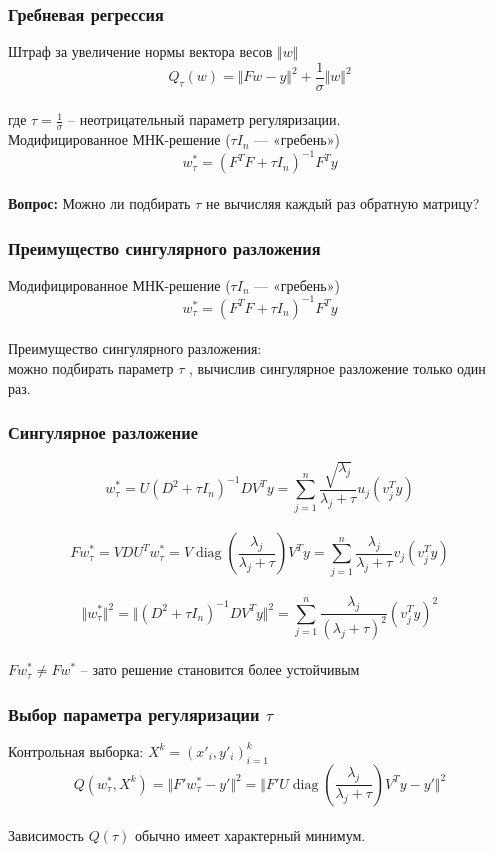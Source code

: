 \documentclass[12pt]{beamer}
\begin{document}
\begin{frame}\frametitle{Гребневая регрессия}
Штраф за увеличение нормы вектора весов $\Vert w \Vert$\\
$$Q_{\tau} (w) = \Vert F w - y \Vert^2 + \frac{1}{\sigma} \Vert w \Vert^2$$\\
где $\tau = \frac{1}{\sigma}$ -- неотрицательный параметр регуляризации.\\
\vspace{5mm}
Модифицированное МНК-решение ($\tau I_n$ — «гребень»)\\
$$w^*_{\tau} = (F^TF + \tau I_n)^{-1}F^Ty$$\\

\textbf{Вопрос:} Можно ли подбирать $\tau$ не вычисляя каждый раз обратную матрицу?
\end{frame}

\begin{frame}\frametitle{Преимущество сингулярного разложения}
Модифицированное МНК-решение ($\tau I_n$ — «гребень»)\\
$$w^*_{\tau} = (F^TF + \tau I_n)^{-1}F^Ty$$\\
Преимущество сингулярного разложения:\\
можно подбирать параметр $\tau$ , вычислив сингулярное разложение только один раз.
\end{frame}

\begin{frame}\frametitle{Сингулярное разложение}
$$w_{\tau}^*= U(D^2 + \tau I_n)^{-1}DV^Ty = \sum\limits_{j=1}^n \frac{\sqrt{\lambda_j}}{\lambda_j + \tau} u_j(v_j^Ty)$$\\
$$Fw_{\tau}^* = VDU^Tw_{\tau}^* = V \operatorname{diag} \left(\frac{\lambda_j}{\lambda_j + \tau}\right) V^Ty = \sum\limits_{j=1}^n \frac{\lambda_j}{\lambda_j + \tau} v_j (v_j^Ty)$$\\
$$\Vert w_{\tau}^* \Vert^2 = \Vert (D^2 + \tau I_n)^{-1} DV^T y \Vert^2 = \sum\limits_{j=1}^n \frac{\lambda_j}{(\lambda_j + \tau)^2} (v^T_j y)^2$$\\
$F w_{\tau}^* \neq Fw^*$ -- зато решение становится более устойчивым
\end{frame}

\begin{frame}\frametitle{Выбор параметра регуляризации $\tau$}
Контрольная выборка: $X^k = (x'_i, y'_i)_{i=1}^k$\\
$$Q(w_{\tau}^*,X^k) = \Vert F' w_{\tau}^* - y' \Vert^2 = \Vert F'U \operatorname{diag} \left(\frac{\lambda_j}{\lambda_j + \tau}\right) V^T y -y' \Vert^2$$\\
Зависимость $Q(\tau)$ обычно имеет характерный минимум.
\end{frame}
\end{document}
